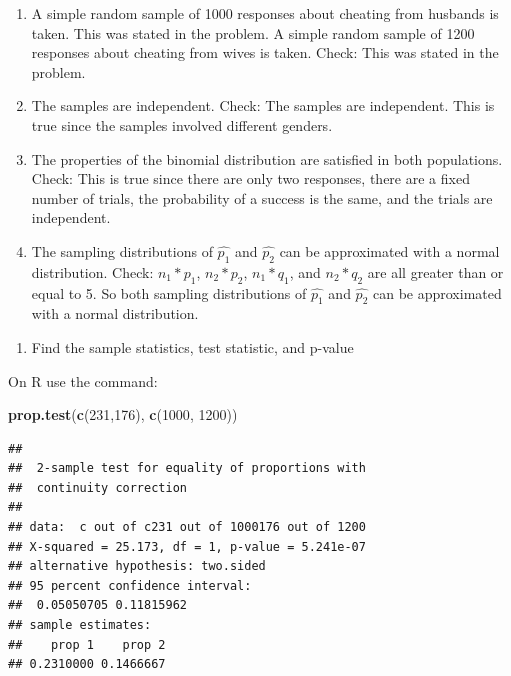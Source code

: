 \documentclass[
]{book}
\newenvironment{Shaded}{\begin{snugshade}}{\end{snugshade}}
\newcommand{\DecValTok}[1]{\textcolor[rgb]{0.00,0.00,0.81}{#1}}
\newcommand{\KeywordTok}[1]{\textcolor[rgb]{0.13,0.29,0.53}{\textbf{#1}}}
\newcommand{\NormalTok}[1]{#1}
\providecommand{\tightlist}{%
  \setlength{\itemsep}{0pt}\setlength{\parskip}{0pt}}
\begin{document}
\begin{enumerate}
\def\labelenumi{\alph{enumi}.}
\item
  A simple random sample of 1000 responses about cheating from husbands is taken. This was stated in the problem. A simple random sample of 1200 responses about cheating from wives is taken. Check: This was stated in the problem.
\item
  The samples are independent. Check: The samples are independent. This is true since the samples involved different genders.
\item
  The properties of the binomial distribution are satisfied in both populations. Check: This is true since there are only two responses, there are a fixed number of trials, the probability of a success is the same, and the trials are independent.
\item
  The sampling distributions of \(\hat{p_1}\) and \(\hat{p_2}\) can be approximated with a normal distribution. Check: \(n_1*p_1\), \(n_2*p_2\), \(n_1*q_1\), and \(n_2*q_2\) are all greater than or equal to 5. So both sampling distributions of \(\hat{p_1}\) and \(\hat{p_2}\) can be approximated with a normal distribution.
\end{enumerate}

\begin{enumerate}
\def\labelenumi{\arabic{enumi}.}
\setcounter{enumi}{3}
\tightlist
\item
  Find the sample statistics, test statistic, and p-value
\end{enumerate}

On R use the command:

\begin{Shaded}
\begin{Highlighting}[]
\KeywordTok{prop.test}\NormalTok{(}\KeywordTok{c}\NormalTok{(}\DecValTok{231}\NormalTok{,}\DecValTok{176}\NormalTok{), }\KeywordTok{c}\NormalTok{(}\DecValTok{1000}\NormalTok{, }\DecValTok{1200}\NormalTok{))}
\end{Highlighting}
\end{Shaded}

\begin{verbatim}
## 
## 	2-sample test for equality of proportions with
## 	continuity correction
## 
## data:  c out of c231 out of 1000176 out of 1200
## X-squared = 25.173, df = 1, p-value = 5.241e-07
## alternative hypothesis: two.sided
## 95 percent confidence interval:
##  0.05050705 0.11815962
## sample estimates:
##    prop 1    prop 2 
## 0.2310000 0.1466667
\end{verbatim}
\end{document}
